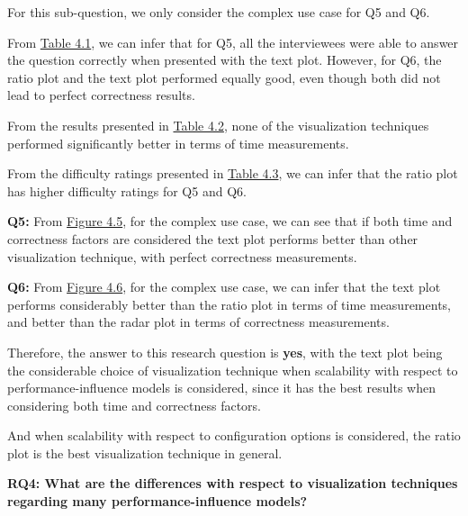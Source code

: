 For this sub-question, we only consider the complex use case for Q5 and Q6.

\begin{description}[leftmargin=0pt]
\item[Correctness: ] From \hyperref[table:correctness]{Table 4.1}, we can infer that for Q5, all the interviewees were able to answer the question correctly when presented with the text plot. However, for Q6, the ratio plot and the text plot performed equally good, even though both did not lead to perfect correctness results.

\item[Time Measurements: ] From the results presented in \hyperref[table:time]{Table 4.2}, none of the visualization techniques performed significantly better in terms of time measurements.

\item[Difficulty Ratings: ] From the difficulty ratings presented in \hyperref[table:rating]{Table 4.3}, we can infer that the ratio plot has higher difficulty ratings for Q5 and Q6.

\end{description}

\textbf{Q5:} From \hyperref[figure:paretoManyQ5]{Figure 4.5}, for the complex use case, we can see that if both time and correctness factors are considered the text plot performs better than other visualization technique, with perfect correctness measurements.

\textbf{Q6:} From \hyperref[figure:paretoManyQ6]{Figure 4.6}, for the complex use case, we can infer that the text plot performs considerably better than the ratio plot in terms of time measurements, and better than the radar plot in terms of correctness measurements.

Therefore, the answer to this research question is \textbf{yes}, with the text plot being the considerable choice of visualization technique when scalability with respect to performance-influence models is considered, since it has the best results when considering both time and correctness factors.

And when scalability with respect to configuration options is considered, the ratio plot is the best visualization technique in general.


\vskip 0.2in
\begin{mdframed}
\textbf {RQ4: What are the differences with respect to visualization techniques regarding many performance-influence models?}
\end{mdframed}


